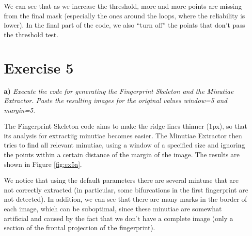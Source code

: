 \documentclass[11pt]{article}
\begin{document}
We can see that as we increase the threshold, more and more points are missing from the final mask (especially the ones around the loops, where the reliability is lower). In the final part of the code, we also ``turn off'' the points that don't pass the threshold test.

\section*{Exercise 5}

\textbf{a) }\emph{Execute the code for generating the Fingerprint Skeleton and the Minutiae Extractor. Paste the resulting images for the original values window=5 and margin=5.}

The Fingerprint Skeleton code aims to make the ridge lines thinner (1px), so that its analysis for extractiig minutiae becomes easier. The Minutiae Extractor then tries to find all relevant minutiae, using a window of a specified size and ignoring the points within a certain distance of the margin of the image. The results are shown in Figure \ref{fig:ex5a}.

We notice that using the default parameters there are several mintuae that are not correctly extracted (in particular, some bifurcations in the first fingerprint are not detected). In addition, we can see that there are many marks in the border of each image, which can be suboptimal, since these minutiae are somewhat artificial and caused by the fact that we don't have a complete image (only a section of the frontal projection of the fingerprint).
\end{document}
